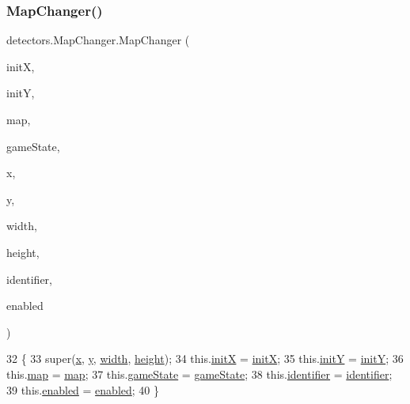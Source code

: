 \subsubsection{\texorpdfstring{Map\+Changer()}{MapChanger()}\hspace{0.1cm}{\footnotesize\ttfamily [2/2]}}
{\footnotesize\ttfamily detectors.\+Map\+Changer.\+Map\+Changer (\begin{DoxyParamCaption}\item[{int}]{initX,  }\item[{int}]{initY,  }\item[{String}]{map,  }\item[{\mbox{\hyperlink{classstates_1_1_game_state}{Game\+State}}}]{game\+State,  }\item[{int}]{x,  }\item[{int}]{y,  }\item[{int}]{width,  }\item[{int}]{height,  }\item[{int}]{identifier,  }\item[{boolean}]{enabled }\end{DoxyParamCaption})\hspace{0.3cm}{\ttfamily [inline]}}


\begin{DoxyCode}
32                                                                                                            
                                              \{
33         super(\mbox{\hyperlink{classorg_1_1newdawn_1_1slick_1_1geom_1_1_shape_a3e985bfff386c15a4efaad03d8ad60d3}{x}}, \mbox{\hyperlink{classorg_1_1newdawn_1_1slick_1_1geom_1_1_shape_a9f934baded6a1b65ebb69e7e5f80ea00}{y}}, \mbox{\hyperlink{classorg_1_1newdawn_1_1slick_1_1geom_1_1_rectangle_a967e1823f62daf45abb142779d1be62d}{width}}, \mbox{\hyperlink{classorg_1_1newdawn_1_1slick_1_1geom_1_1_rectangle_a3bd010fdce636fc11ed0e0ad4d4b4a0a}{height}});
34         this.\mbox{\hyperlink{classdetectors_1_1_map_changer_a45c8356dc930a1289333a55a1a13a606}{initX}} = \mbox{\hyperlink{classdetectors_1_1_map_changer_a45c8356dc930a1289333a55a1a13a606}{initX}};
35         this.\mbox{\hyperlink{classdetectors_1_1_map_changer_a893e5aefb0e75665409f73b6e1542b59}{initY}} = \mbox{\hyperlink{classdetectors_1_1_map_changer_a893e5aefb0e75665409f73b6e1542b59}{initY}};
36         this.\mbox{\hyperlink{classdetectors_1_1_map_changer_ad642fa774f24afd2651f54d430608092}{map}} = \mbox{\hyperlink{classdetectors_1_1_map_changer_ad642fa774f24afd2651f54d430608092}{map}};
37         this.\mbox{\hyperlink{classdetectors_1_1_map_changer_a2a72dbaade77a4f83acdc5ba1d745c48}{gameState}} = \mbox{\hyperlink{classdetectors_1_1_map_changer_a2a72dbaade77a4f83acdc5ba1d745c48}{gameState}};
38         this.\mbox{\hyperlink{classdetectors_1_1_map_changer_a4c880379dc5b9cdd0c11d388ed7d28ca}{identifier}} = \mbox{\hyperlink{classdetectors_1_1_map_changer_a4c880379dc5b9cdd0c11d388ed7d28ca}{identifier}};
39         this.\mbox{\hyperlink{classdetectors_1_1_map_changer_a603d3a106676167a607d9acd5176f8f8}{enabled}} = \mbox{\hyperlink{classdetectors_1_1_map_changer_a603d3a106676167a607d9acd5176f8f8}{enabled}};
40     \}
\end{DoxyCode}



